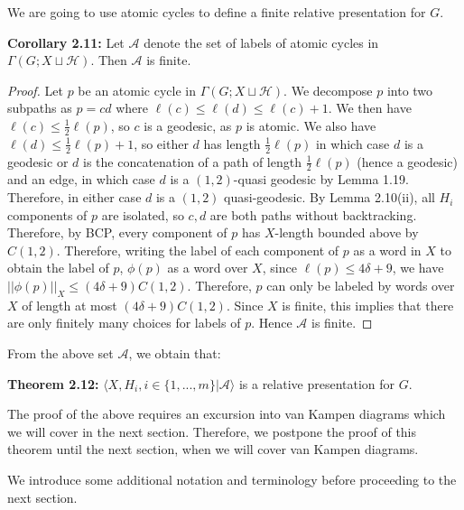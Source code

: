 \documentclass[12pt]{article}
\newcommand{\vs}{\vskip10pt}
\begin{document}
	We are going to use atomic cycles to define a finite relative presentation for $G$. 
	
	\vs 
	
	\textbf{Corollary 2.11: } Let $\mathcal{A}$ denote the set of labels of atomic cycles in $\Gamma(G; X \sqcup \mathcal{H})$. Then $\mathcal{A}$ is finite. 
	
	\begin{proof}
		
		Let $p$ be an atomic cycle in $\Gamma(G; X \sqcup \mathcal{H})$. We decompose $p$ into two subpaths as $p = cd$ where $\ell(c) \leq \ell(d) \leq \ell(c) + 1$. We then have $\ell(c) \leq \frac{1}{2} \ell(p)$, so $c$ is a geodesic, as $p$ is atomic. We also have $\ell(d) \leq \frac{1}{2} \ell (p) + 1$, so either $d$ has length $\frac{1}{2} \ell (p)$ in which case $d$ is a geodesic or $d$ is the concatenation of a path of length $\frac{1}{2} \ell(p)$ (hence a geodesic) and an edge, in which case $d$ is a $(1,2)$-quasi geodesic by Lemma 1.19. Therefore, in either case $d$ is a $(1,2)$ quasi-geodesic. By Lemma 2.10(ii), all $H_i$ components of $p$ are isolated, so $c,d$ are both paths without backtracking. Therefore, by BCP, every component of $p$ has $X$-length bounded above by $C(1,2)$. Therefore, writing the label of each component of $p$ as a word in $X$ to obtain the label of $p$, $\phi(p)$ as a word over $X$, since $\ell(p) \leq 4 \delta + 9$, we have $\vert \vert \phi(p) \vert \vert_X \leq (4 \delta + 9) C(1,2)$. Therefore, $p$ can only be labeled by words over $X$ of length at most $(4 \delta + 9) C(1,2)$. Since $X$ is finite, this implies that there are only finitely many choices for labels of $p$. Hence $\mathcal{A}$ is finite. 
	\end{proof}

	From the above set $\mathcal{A}$, we obtain that: 
	
	\vs 
	
	\textbf{Theorem 2.12: } $\langle X, H_i, i \in \{1,...,m\} \vert \mathcal{A} \rangle$ is a relative presentation for $G$. 
	
	\vs 
	
	The proof of the above requires an excursion into van Kampen diagrams which we will cover in the next section. Therefore, we postpone the proof of this theorem until the next section, when we will cover van Kampen diagrams. 
	
	\vs 
	
	We introduce some additional notation and terminology before proceeding to the next section. 
	
\end{document}
